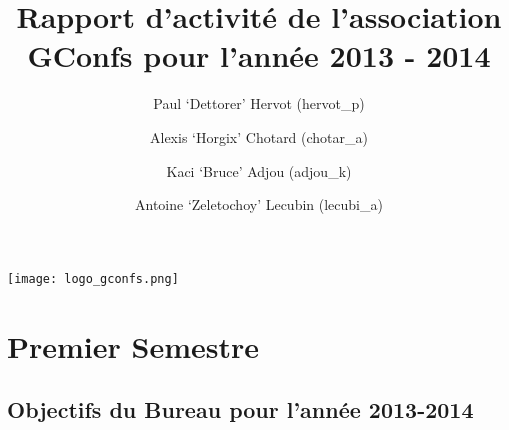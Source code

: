 \documentclass[12pt]{report}
\title{Rapport d'activité de l'association GConfs pour l'année 2013 - 2014}
\author{Paul `Dettorer' Hervot (hervot\_p)
        \and Alexis `Horgix' Chotard (chotar\_a)
        \and Kaci `Bruce' Adjou (adjou\_k)
        \and Antoine `Zeletochoy' Lecubin (lecubi\_a)}
\begin{document}
  \begin{titlepage}
    \begin{center}
      \texttt{[image: logo\_gconfs.png]} \\
    \end{center}
    {\let\newpage\relax\maketitle}
  \end{titlepage}
  \chapter{Premier Semestre}
  \section{Objectifs du Bureau pour l'année 2013-2014}
\end{document}
